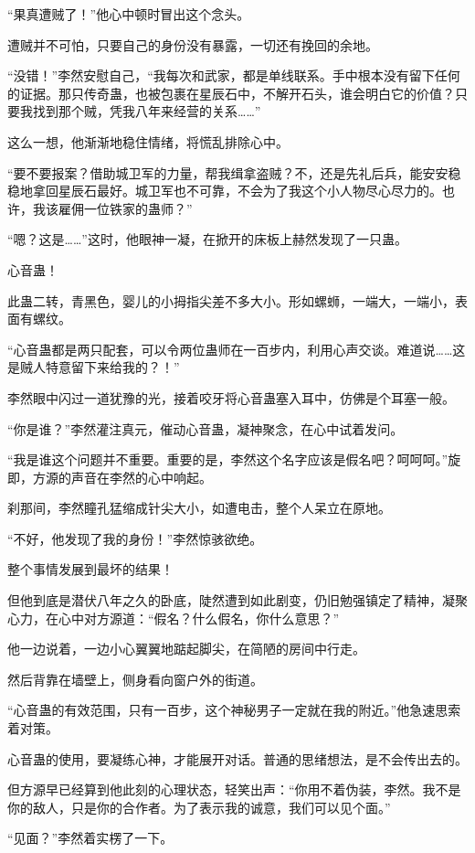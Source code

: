 \begin{this_body}
“果真遭贼了！”他心中顿时冒出这个念头。

遭贼并不可怕，只要自己的身份没有暴露，一切还有挽回的余地。

“没错！”李然安慰自己，“我每次和武家，都是单线联系。手中根本没有留下任何的证据。那只传奇蛊，也被包裹在星辰石中，不解开石头，谁会明白它的价值？只要我找到那个贼，凭我八年来经营的关系……”

这么一想，他渐渐地稳住情绪，将慌乱排除心中。

“要不要报案？借助城卫军的力量，帮我缉拿盗贼？不，还是先礼后兵，能安安稳稳地拿回星辰石最好。城卫军也不可靠，不会为了我这个小人物尽心尽力的。也许，我该雇佣一位铁家的蛊师？”

“嗯？这是……”这时，他眼神一凝，在掀开的床板上赫然发现了一只蛊。

心音蛊！

此蛊二转，青黑色，婴儿的小拇指尖差不多大小。形如螺蛳，一端大，一端小，表面有螺纹。

“心音蛊都是两只配套，可以令两位蛊师在一百步内，利用心声交谈。难道说……这是贼人特意留下来给我的？！”

李然眼中闪过一道犹豫的光，接着咬牙将心音蛊塞入耳中，仿佛是个耳塞一般。

“你是谁？”李然灌注真元，催动心音蛊，凝神聚念，在心中试着发问。

“我是谁这个问题并不重要。重要的是，李然这个名字应该是假名吧？呵呵呵。”旋即，方源的声音在李然的心中响起。

刹那间，李然瞳孔猛缩成针尖大小，如遭电击，整个人呆立在原地。

“不好，他发现了我的身份！”李然惊骇欲绝。

整个事情发展到最坏的结果！

但他到底是潜伏八年之久的卧底，陡然遭到如此剧变，仍旧勉强镇定了精神，凝聚心力，在心中对方源道：“假名？什么假名，你什么意思？”

他一边说着，一边小心翼翼地踮起脚尖，在简陋的房间中行走。

然后背靠在墙壁上，侧身看向窗户外的街道。

“心音蛊的有效范围，只有一百步，这个神秘男子一定就在我的附近。”他急速思索着对策。

心音蛊的使用，要凝练心神，才能展开对话。普通的思绪想法，是不会传出去的。

但方源早已经算到他此刻的心理状态，轻笑出声：“你用不着伪装，李然。我不是你的敌人，只是你的合作者。为了表示我的诚意，我们可以见个面。”

“见面？”李然着实楞了一下。


\end{this_body}
